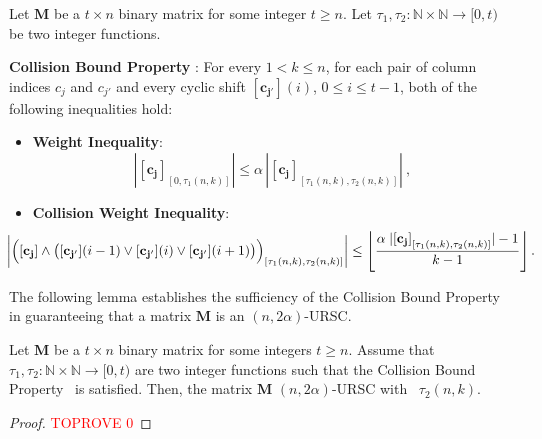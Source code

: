 \documentclass[11pt]{article}
\begin{document}
\begin{definition}\label{CBproperty}
Let $\mathbf{M}$ be a $t \times n$ 
binary matrix for some integer $t \ge n$. Let $\tau_1, \tau_2: \mathbb{N} \times \mathbb{N} \to [0,t)$ 
be two integer functions. 

\medskip
\textbf{Collision Bound Property} \pairCondition: For every $1 < k \leq n$, for each pair of column indices $c_j$ and $c_{j'}$ and every cyclic shift $\mathbf{[c_{j'}]}(i)$, $0 \leq i \leq t-1$, both of the following inequalities hold:

\begin{itemize}\item \textbf{Weight Inequality}:
    \begin{equation}\label{conjineq}
        |\mathbf{[c_j]}_{[0, \tau_1(n, k) ]} |
        \le \alpha\,|\mathbf{[c_j]}_{[\tau_1(n, k), \tau_2(n, k)]}| \ ,
    \end{equation}
    \item \textbf{Collision Weight Inequality}:
    \begin{equation}
    \label{conjineq2}
    \hspace*{-2em}
        \left|\Big(\mathbf{[c_j]} \land \big(\mathbf{[c_{j'}]}(i-1) 
                               \lor \mathbf{[c_{j'}]}(i) 
                               \lor \mathbf{[c_{j'}]}(i+1) \big)
                               \Big)_{[\tau_1(n, k), \tau_2(n, k)]}
        \right| 
        \leq \left\lfloor \frac{\alpha  \; |\mathbf{[c_j]}_{[\tau_1(n, k), \tau_2(n, k)]}|  - 1}{k - 1} \right\rfloor.
    \end{equation}     
\end{itemize}  
\end{definition}


The following lemma establishes the sufficiency of the Collision Bound Property in guaranteeing that
a matrix $\mathbf{M}$ is an $(n, 2\alpha)$-URSC.

\begin{lemma}\label{1e3}
Let $\mathbf{M}$ be a $t \times n$ binary 
matrix for some integers $t \ge n$. Assume that $\tau_1, \tau_2: \mathbb{N} \times \mathbb{N} \to [0,t)$  
are two integer functions such that the Collision Bound Property \pairCondition\ is satisfied.
Then, the matrix $\mathbf{M}$ 
{$(n, 2\alpha)$}-URSC with \elongation\ $\tau_2(n,k)$.
\end{lemma}

\begin{proof}\textcolor{red}{TOPROVE 0}\end{proof}
\end{document}
